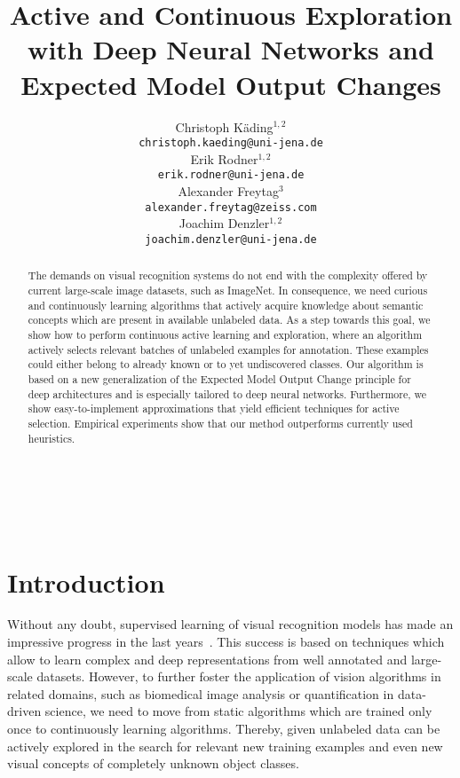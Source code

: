 \documentclass{article}
\title{Active and Continuous Exploration with Deep Neural Networks and Expected Model Output Changes}
\author{
    Christoph K{\"a}ding$^{1,2}$\\
    \small\texttt{christoph.kaeding@uni-jena.de}\\
    \And
    Erik Rodner$^{1,2}$\\
    \small\texttt{erik.rodner@uni-jena.de}\\
    \And
    Alexander Freytag$^{3}$\\
    \small\texttt{alexander.freytag@zeiss.com}\\
    \And
    Joachim Denzler$^{1,2}$\\
    \small\texttt{joachim.denzler@uni-jena.de}\\
}
\begin{document}
%

\maketitle

\vspace{-1.5em}{
    \centering
    $^1$Computer Vision Group, Friedrich Schiller University Jena, Germany\\
    $^2$Michael Stifel Center Jena, Germany\\
    $^3$Carl Zeiss AG, Jena, Germany\\
}

\\\

\begin{abstract}
    The demands on visual recognition systems do not end with the complexity offered by current large-scale image datasets, such as ImageNet. %
    In consequence,
    we need curious and continuously learning algorithms that actively acquire knowledge about semantic concepts which are present in available unlabeled data.
    As a step towards this goal,
    we show how to perform continuous active learning and exploration,
    where an algorithm actively selects relevant batches of unlabeled examples for annotation.
    These examples could either belong to already known or to yet undiscovered classes.
    Our algorithm is based on a new generalization of the Expected Model Output Change principle for deep architectures and is especially tailored to deep neural networks.
    Furthermore,
    we show easy-to-implement approximations that yield efficient techniques for active selection.
    Empirical experiments show that our method outperforms currently used heuristics.
\end{abstract}

\section{Introduction}
%
Without any doubt,
supervised learning of visual recognition models has made an impressive progress in the last years~\cite{Agrawal14:APM,Babenko2014,Hariharan2014,Branson2014a,Girshick2014}.
This success is based on techniques which allow to learn complex and deep representations from well annotated and large-scale datasets.
However, to further foster the application of vision algorithms in related domains, such as biomedical image analysis or
quantification in data-driven science, we need to move from static algorithms which are trained only once to continuously learning algorithms.
Thereby,
given unlabeled data can be actively explored in the search
for relevant new training examples and even new visual concepts of completely unknown object classes.
\end{document}
